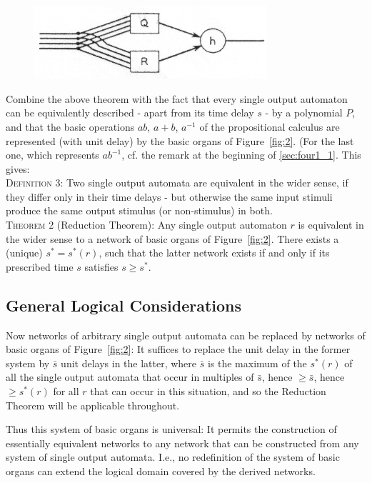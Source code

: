\documentclass[twocolumn,preprintnumbers,amsmath,amssymb,floatfix]{revtex4}
\begin{document}
\begin{figure}[b]
\includegraphics[width=3.4in]{fig_6}
\caption{\label{fig:6}}
\end{figure}

Combine the above theorem with the fact that every single output
automaton can be equivalently described - apart from its time
delay $s$ - by a polynomial $P$, and that the basic operations
$ab$, $a+b$, $a^{-1}$ of the propositional calculus are
represented (with unit delay) by the basic organs of
Figure~\ref{fig:2}. (For the last one, which represents $ab^{-1}$,
cf. the remark at the beginning of \ref{sec:four1_1}. This
gives:\\

\noindent \textsc{Definition 3:} Two single output automata are
equivalent in the wider sense, if they differ only in their time
delays - but otherwise the same input stimuli produce the same
output stimulus (or non-stimulus) in both.\\

\noindent \textsc{Theorem 2} (Reduction Theorem): Any single
output automaton $r$ is equivalent in the wider sense to a network
of basic organs of Figure~\ref{fig:2}. There exists a (unique)
$s^*=s^*(r)$, such that the latter network exists if and only if
its prescribed time $s$ satisfies $s\geq s^*$.

\subsection{\label{sec:three3}General Logical Considerations}

Now networks of arbitrary single output automata can be replaced
by networks of basic organs of Figure~\ref{fig:2}: It suffices to
replace the unit delay in the former system by $\bar{s}$ unit
delays in the latter, where $\bar{s}$ is the maximum of the
$s^*(r)$ of all the single output automata that occur in multiples
of $\bar{s}$, hence $\geq \bar{s}$, hence $\geq s^*(r)$ for all
$r$ that can occur in this situation, and so the Reduction Theorem
will be applicable throughout.

Thus this system of basic organs is universal: It permits the
construction of essentially equivalent networks to any network
that can be constructed from any system of single output automata.
I.e., no redefinition of the system of basic organs can extend the
logical domain covered by the derived networks.
\end{document}
